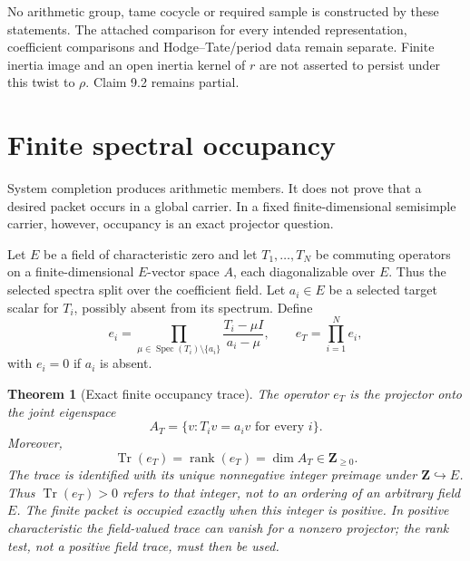 \documentclass[11pt]{article}
\newtheorem{theorem}{Theorem}[section]
\theoremstyle{definition}
\theoremstyle{remark}
\newcommand{\Z}{\mathbf Z}
\newcommand{\Spec}{\operatorname{Spec}}
\newcommand{\Tr}{\operatorname{Tr}}
\newcommand{\rank}{\operatorname{rank}}
\begin{document}
No arithmetic group, tame cocycle or required sample is constructed by these
statements. The attached comparison for every intended representation,
coefficient comparisons and Hodge--Tate/period data remain separate. Finite
inertia image and an open inertia kernel of $r$ are not asserted to persist
under this twist to $\rho$. Claim 9.2 remains partial.

\section{Finite spectral occupancy}

System completion produces arithmetic members.  It does not prove that a desired packet occurs in a global carrier.  In a fixed finite-dimensional semisimple carrier, however, occupancy is an exact projector question.

Let \(E\) be a field of characteristic zero and let \(T_1,\ldots,T_N\) be commuting operators on a finite-dimensional \(E\)-vector space \(A\), each diagonalizable over \(E\).  Thus the selected spectra split over the coefficient field.  Let \(a_i\in E\) be a selected target scalar for \(T_i\), possibly absent from its spectrum.  Define
\[
e_i
=
\prod_{\mu\in\Spec(T_i)\setminus\{a_i\}}
\frac{T_i-\mu I}{a_i-\mu},
\qquad
e_T=\prod_{i=1}^{N}e_i,
\]
with \(e_i=0\) if \(a_i\) is absent.

\begin{theorem}[Exact finite occupancy trace]\label{px:10.1}
The operator \(e_T\) is the projector onto the joint eigenspace
\[
A_T
=
\{v:T_iv=a_iv\text{ for every }i\}.
\]
Moreover,
\[
\boxed{
\Tr(e_T)=\rank(e_T)=\dim A_T\in\Z_{\ge0}.
}
\]
The trace is identified with its unique nonnegative integer preimage under \(\Z\hookrightarrow E\).  Thus \(\Tr(e_T)>0\) refers to that integer, not to an ordering of an arbitrary field \(E\).  The finite packet is occupied exactly when this integer is positive.  In positive characteristic the field-valued trace can vanish for a nonzero projector; the rank test, not a positive field trace, must then be used.
\end{theorem}
\end{document}
